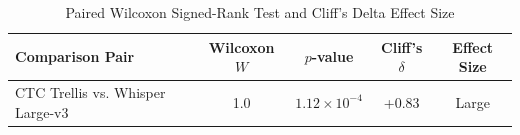 \begin{table}[t]
\centering
\caption{Paired Wilcoxon Signed-Rank Test and Cliff's Delta Effect Size}
\label{tab:statistical_significance}
\begin{tabular}{lcccc}
\toprule
Comparison Pair & Wilcoxon \(W\) & \(p\)-value & Cliff's \(\delta\) & Effect Size \\
\midrule
CTC Trellis vs. Whisper Large-v3 & 1.0 & $1.12 \times 10^{-4}$ & +0.83 & Large \\
\bottomrule
\end{tabular}
\end{table}

